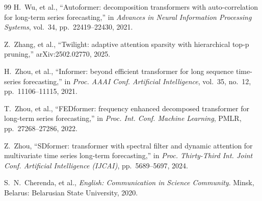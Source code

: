 \documentclass[journal]{IEEEtran}
\begin{document}
\begin{thebibliography}{99}
H.~Wu, et al., ``Autoformer: decomposition transformers with auto-correlation for long-term series
forecasting,'' in \textit{Advances in Neural Information Processing Systems}, vol.~34,
pp.~22419--22430, 2021.

Z.~Zhang, et al., ``Twilight: adaptive attention sparsity with hierarchical top-p pruning,''
arXiv:2502.02770, 2025.

H.~Zhou, et al., ``Informer: beyond efficient transformer for long sequence time-series
forecasting,'' in \textit{Proc. AAAI Conf. Artificial Intelligence}, vol.~35, no.~12,
pp.~11106--11115, 2021.

T.~Zhou, et al., ``FEDformer: frequency enhanced decomposed transformer for long-term series
forecasting,'' in \textit{Proc. Int. Conf. Machine Learning}, PMLR, pp.~27268--27286, 2022.

Z.~Zhou, ``SDformer: transformer with spectral filter and dynamic attention for multivariate time
series long-term forecasting,'' in \textit{Proc. Thirty-Third Int. Joint Conf. Artificial
Intelligence (IJCAI)}, pp.~5689--5697, 2024.

S.~N.~Cherenda, et al., \textit{English: Communication in Science Community}. Minsk, Belarus:
Belarusian State University, 2020.

\end{thebibliography}
\end{document}
